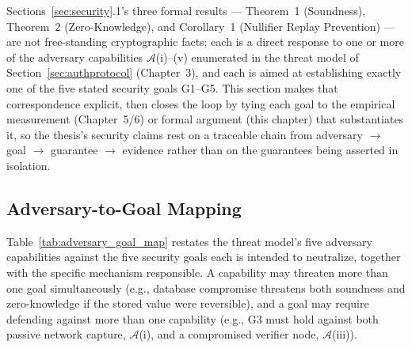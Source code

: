 \documentclass[12pt,a4paper,oneside]{report}
\begin{document}
Sections~\ref{sec:security}.1's three formal results --- Theorem~1
(Soundness), Theorem~2 (Zero-Knowledge), and Corollary~1 (Nullifier
Replay Prevention) --- are not free-standing cryptographic facts; each
is a direct response to one or more of the adversary capabilities
$\mathcal{A}$(i)--(v) enumerated in the threat model of
Section~\ref{sec:authprotocol} (Chapter~3), and each is aimed at
establishing exactly one of the five stated security goals
G1--G5. This section makes that correspondence explicit, then closes
the loop by tying each goal to the empirical measurement
(Chapter~5/6) or formal argument (this chapter) that substantiates it,
so the thesis's security claims rest on a traceable chain from
adversary $\rightarrow$ goal $\rightarrow$ guarantee $\rightarrow$
evidence rather than on the guarantees being asserted in isolation.

\subsection{Adversary-to-Goal Mapping}

Table~\ref{tab:adversary_goal_map} restates the threat model's five
adversary capabilities against the five security goals each is
intended to neutralize, together with the specific mechanism
responsible. A capability may threaten more than one goal
simultaneously (e.g., database compromise threatens both soundness and
zero-knowledge if the stored value were reversible), and a goal may
require defending against more than one capability (e.g., G3 must hold
against both passive network capture, $\mathcal{A}$(i), and a
compromised verifier node, $\mathcal{A}$(iii)).
\end{document}
